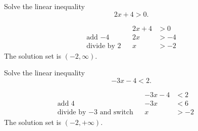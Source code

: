	\begin{multicols}{2}
		\begin{example} 
			Solve the linear inequality 
			\[
				2x+4>0.
			\]
		\end{example}
		\begin{solution}
				\begin{align*}
&  & 2x+4 & >0  \\
					\text{add $-4$}      &  & 2x   & >-4 \\
					\text{divide by $2$} &  & x    & >-2
				\end{align*}
			The solution set is $(-2, \infty)$.
		\end{solution}

		\columnbreak

		\begin{example}
			Solve the linear inequality 
			\[
				-3x-4<2.
			\]
		\end{example}
		\begin{solution}
				\begin{align*}
					                                 &  & -3x-4 & <2       \\
					\text{add $4$}                   &  & -3x   & <6  &  & \\
					\text{divide by $-3$ and switch} &  & x     & >-2      %
				\end{align*}
			The solution set is $(-2, +\infty)$.
		\end{solution}
	\end{multicols}



